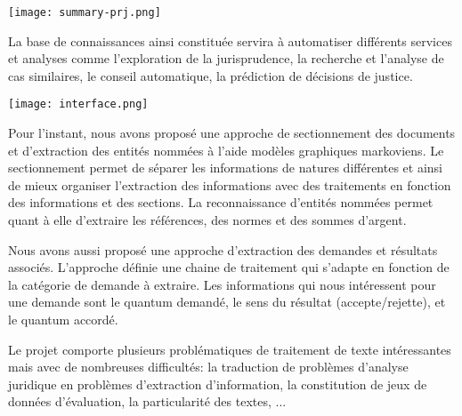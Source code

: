 \documentclass[12pt,a4paper,oneside]{article}
\begin{document}
\texttt{[image: summary-prj.png]}
%


La base de connaissances ainsi constituée servira à automatiser différents services et analyses comme l'exploration de la jurisprudence, la recherche et l'analyse de cas similaires, le conseil automatique, la prédiction de décisions de justice.

\texttt{[image: interface.png]}


Pour l'instant, nous avons proposé une approche de sectionnement des documents et d'extraction des entités nommées à l'aide modèles graphiques markoviens. Le sectionnement  permet de séparer les informations de natures différentes et ainsi de mieux organiser l'extraction des informations avec des traitements en fonction des informations et des sections. La reconnaissance d'entités nommées permet quant à elle d'extraire les références, des normes et des sommes d'argent.

Nous avons aussi proposé une approche d'extraction des demandes et résultats associés. L'approche définie une chaine de traitement qui s'adapte en fonction de la catégorie de demande à extraire. Les informations qui nous intéressent pour une demande sont le quantum demandé, le sens du résultat (accepte/rejette), et le quantum accordé.

Le projet comporte plusieurs problématiques de traitement de texte intéressantes mais avec de nombreuses difficultés: la traduction de problèmes d'analyse juridique en problèmes d'extraction d'information, la constitution de jeux de données d'évaluation, la particularité des textes, ...
\end{document}
